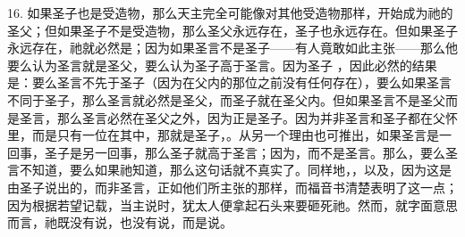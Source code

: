 16. 如果圣子也是受造物，那么天主完全可能像对其他受造物那样，开始成为祂的圣父；但如果圣子不是受造物，那么圣父永远存在，圣子也永远存在。但如果圣子永远存在，祂就必然是；因为如果圣言不是圣子——有人竟敢如此主张——那么他要么认为圣言就是圣父，要么认为圣子高于圣言。因为圣子 ，因此必然的结果是：要么圣言不先于圣子（因为在父内的那位之前没有任何存在），要么如果圣言不同于圣子，那么圣言就必然是圣父，而圣子就在圣父内。但如果圣言不是圣父而是圣言，那么圣言必然在圣父之外，因为正是圣子。因为并非圣言和圣子都在父怀里，而是只有一位在其中，那就是圣子，。从另一个理由也可推出，如果圣言是一回事，圣子是另一回事，那么圣子就高于圣言；因为，而不是圣言。那么，要么圣言不知道，要么如果祂知道，那么这句话就不真实了。同样地，，以及，因为这是由圣子说出的，而非圣言，正如他们所主张的那样，而福音书清楚表明了这一点；因为根据若望记载，当主说时，犹太人便拿起石头来要砸死祂。然而，就字面意思而言，祂既没有说，也没有说，而是说。\par

